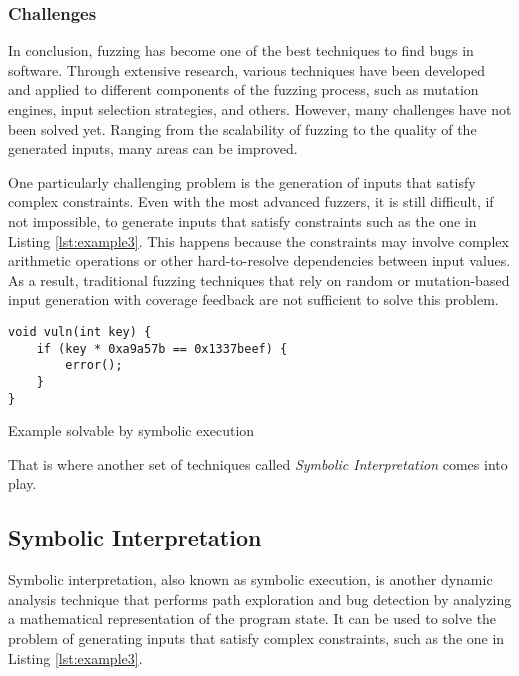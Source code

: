\subsubsection{Challenges} \label{fuzzing:challenges}

In conclusion, fuzzing has become one of the best techniques \cite{fuzzing-a-survey-2018} to find bugs in software. Through extensive research, various techniques have been developed and applied to different components of the fuzzing process, such as mutation engines, input selection strategies, and others. However, many challenges have not been solved yet. Ranging from the scalability of fuzzing to the quality of the generated inputs, many areas can be improved.

One particularly challenging problem is the generation of inputs that satisfy complex constraints. Even with the most advanced fuzzers, it is still difficult, if not impossible, to generate inputs that satisfy constraints such as the one in Listing \ref{lst:example3}. This happens because the constraints may involve complex arithmetic operations or other hard-to-resolve dependencies between input values. As a result, traditional fuzzing techniques that rely on random or mutation-based input generation with coverage feedback are not sufficient to solve this problem.

\begin{listing}[htp]
	\centering
	\begin{minipage}{.6\linewidth}
		\begin{verbatim}
void vuln(int key) {
	if (key * 0xa9a57b == 0x1337beef) {
		error();
	}
}
		\end{verbatim}
	\end{minipage}
	\caption{Example solvable by symbolic execution}
	\label{lst:example3}
\end{listing}

That is where another set of techniques called \textit{Symbolic Interpretation} comes into play.

\subsection{Symbolic Interpretation}

Symbolic interpretation, also known as symbolic execution, is another dynamic analysis technique that performs path exploration and bug detection by analyzing a mathematical representation of the program state. It can be used to solve the problem of generating inputs that satisfy complex constraints, such as the one in Listing \ref{lst:example3}.

